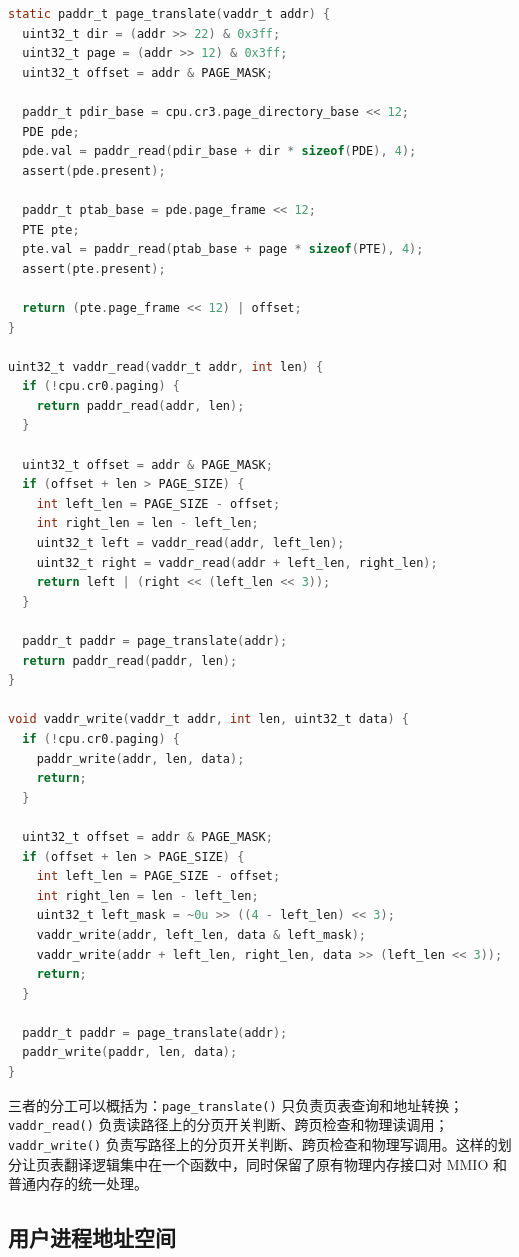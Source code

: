 \begin{lstlisting}[language=C,caption={\texttt{memory.c} 中虚拟地址翻译和读写实现},frame=single]
static paddr_t page_translate(vaddr_t addr) {
  uint32_t dir = (addr >> 22) & 0x3ff;
  uint32_t page = (addr >> 12) & 0x3ff;
  uint32_t offset = addr & PAGE_MASK;

  paddr_t pdir_base = cpu.cr3.page_directory_base << 12;
  PDE pde;
  pde.val = paddr_read(pdir_base + dir * sizeof(PDE), 4);
  assert(pde.present);

  paddr_t ptab_base = pde.page_frame << 12;
  PTE pte;
  pte.val = paddr_read(ptab_base + page * sizeof(PTE), 4);
  assert(pte.present);

  return (pte.page_frame << 12) | offset;
}

uint32_t vaddr_read(vaddr_t addr, int len) {
  if (!cpu.cr0.paging) {
    return paddr_read(addr, len);
  }

  uint32_t offset = addr & PAGE_MASK;
  if (offset + len > PAGE_SIZE) {
    int left_len = PAGE_SIZE - offset;
    int right_len = len - left_len;
    uint32_t left = vaddr_read(addr, left_len);
    uint32_t right = vaddr_read(addr + left_len, right_len);
    return left | (right << (left_len << 3));
  }

  paddr_t paddr = page_translate(addr);
  return paddr_read(paddr, len);
}

void vaddr_write(vaddr_t addr, int len, uint32_t data) {
  if (!cpu.cr0.paging) {
    paddr_write(addr, len, data);
    return;
  }

  uint32_t offset = addr & PAGE_MASK;
  if (offset + len > PAGE_SIZE) {
    int left_len = PAGE_SIZE - offset;
    int right_len = len - left_len;
    uint32_t left_mask = ~0u >> ((4 - left_len) << 3);
    vaddr_write(addr, left_len, data & left_mask);
    vaddr_write(addr + left_len, right_len, data >> (left_len << 3));
    return;
  }

  paddr_t paddr = page_translate(addr);
  paddr_write(paddr, len, data);
}
\end{lstlisting}

三者的分工可以概括为：\texttt{page\_translate()} 只负责页表查询和地址转换；\texttt{vaddr\_read()} 负责读路径上的分页开关判断、跨页检查和物理读调用；\texttt{vaddr\_write()} 负责写路径上的分页开关判断、跨页检查和物理写调用。这样的划分让页表翻译逻辑集中在一个函数中，同时保留了原有物理内存接口对 MMIO 和普通内存的统一处理。

\subsection{用户进程地址空间}

